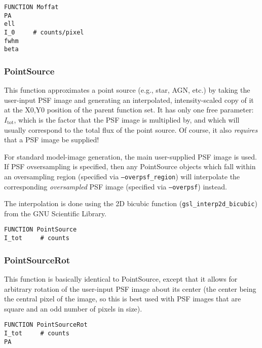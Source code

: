 \documentclass[10pt,a4paper,article]{memoir}
\begin{document}
\begin{verbatim}
FUNCTION Moffat
PA
ell
I_0     # counts/pixel
fwhm
beta
\end{verbatim}


%


\subsubsection{PointSource}

This function approximates a point source (e.g., star, AGN, etc.) by
taking the user-input PSF image and generating an interpolated,
intensity-scaled copy of it at the X0,Y0 position of the parent function
set. It has only one free parameter: $I_{\mathrm{tot}}$, which is the
factor that the PSF image is multiplied by, and which will usually
correspond to the total flux of the point source. Of course, it also
\textit{requires} that a PSF image be supplied!

For standard model-image generation, the main user-supplied PSF image is
used. If PSF ovsersampling is specified, then any PointSource objects
which fall within an oversampling region (specified via
\texttt{--overpsf\_region}) will interpolate the corresponding
\textit{oversampled} PSF image (specified via \texttt{--overpsf}) instead.

The interpolation is done using the 2D bicubic function
(\texttt{gsl\_interp2d\_bicubic}) from the GNU Scientific Library.

\begin{verbatim}
FUNCTION PointSource
I_tot     # counts
\end{verbatim}


\subsubsection{PointSourceRot}

This function is basically identical to PointSource, except that it allows
for arbitrary rotation of the user-input PSF image about its center
(the center being the central pixel of the image, so this is best used
with PSF images that are square and an odd number of pixels in size).

\begin{verbatim}
FUNCTION PointSourceRot
I_tot     # counts
PA
\end{verbatim}
\end{document}
